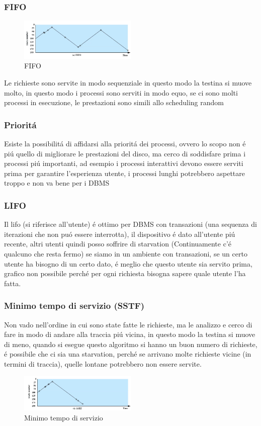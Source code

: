 \subsubsection*{FIFO}
\begin{figure}[H]
    \centering
    \includegraphics[width=0.5\textwidth]{immagini/FIFOHDD}
    \caption{FIFO}
\end{figure}
Le richieste sono servite in modo sequenziale in questo modo la testina si muove molto,
in questo modo i processi sono serviti in modo equo, se ci sono molti processi in esecuzione, le prestazioni sono
simili allo scheduling random
\subsubsection*{Prioritá}
Esiste la possibilitá di affidarsi alla prioritá dei processi, ovvero lo scopo non é piú quello di migliorare le prestazioni
del disco, ma cerco di soddisfare prima i processi piú importanti, ad esempio i processi interattivi devono essere serviti prima
per garantire l'esperienza utente, i processi lunghi potrebbero aspettare troppo e non va bene per i DBMS
\subsubsection*{LIFO}
Il lifo (si riferisce all'utente) é ottimo per DBMS con transazioni (una sequenza di iterazioni che non puó essere interrotta), il dispositivo é dato all'utente
piú recente, altri utenti quindi posso soffrire di starvation (Continuamente c'é qualcuno che resta fermo) se siamo in un
ambiente con transazioni, se un certo utente ha bisogno di un certo dato, é meglio che questo utente sia servito prima, grafico
non possibile perché per ogni richiesta bisogna sapere quale utente l'ha fatta.
\subsubsection*{Minimo tempo di servizio (SSTF)}
Non vado nell'ordine in cui sono state fatte le richieste, ma le analizzo e cerco di fare in modo di andare
alla traccia piú vicina, in questo modo la testina si muove di meno, quando si esegue questo algoritmo si hanno
un buon numero di richieste, é possibile che ci sia una starvation, perché se arrivano molte richieste vicine (in termini di traccia), quelle
lontane potrebbero non essere servite.
\begin{figure}[H]
    \centering
    \includegraphics[width=0.5\textwidth]{immagini/MinimoTempoDiServizio}
    \caption{Minimo tempo di servizio}
\end{figure}
